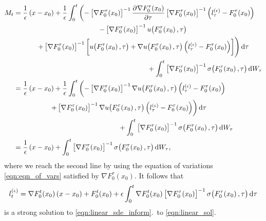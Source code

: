 \begin{align*}
	M_t & = \begin{multlined}[t]
		        \frac{1}{\epsilon}\left(x - x_0\right) + \frac{1}{\epsilon}\int_0^t\left(-\left[\nabla F_0^\tau\!\left(x_0\right)\right]^{-1} \dpd{\nabla F_0^\tau\!\left(x_0\right)}{\tau}\left[\nabla F_0^\tau\!\left(x_0\right)\right]^{-1}\left(l_\tau^{(\epsilon)} - F_0^\tau\!\left(x_0\right) \right)\right. \\
		        \left. - \left[\nabla F_0^\tau\!\left(x_0\right)\right]^{-1}u\!\left(F_0^\tau\!\left(x_0\right), \tau\right)\right. \\
		        \left. + \left[\nabla F_0^\tau\!\left(x_0\right)\right]^{-1}\left[ u\!\left(F_0^\tau\!\left(x_0\right), \tau\right) + \nabla u\!\left(F_0^\tau\!\left(x_0\right), \tau\right) \left(l_\tau^{(\epsilon)} - F_0^\tau\!\left(x_0\right)\right)\right] \right)\dif\tau \\
		        + \int_0^t{\left[\nabla F_0^\tau\!\left(x_0\right)\right]^{-1}\sigma\!\left(F_0^\tau\!\left(x_0\right), \tau\right)\dif W_\tau}
	        \end{multlined} \\
	    & = \begin{multlined}[t]
		        \frac{1}{\epsilon}\left(x - x_0\right) + \frac{1}{\epsilon}\int_0^t\left(-\left[\nabla F_0^\tau\!\left(x_0\right)\right]^{-1} \nabla u\!\left(F_0^\tau\!\left(x_0\right), \tau\right)\left(l_\tau^{(\epsilon)} - F_0^\tau\!\left(x_0\right) \right)\right. \\
		        \left. + \left[\nabla F_0^\tau\!\left(x_0\right)\right]^{-1}\nabla u\!\left(F_0^\tau\!\left(x_0\right), \tau\right) \left(l_\tau^{(\epsilon)} - F_0^\tau\!\left(x_0\right)\right) \right)\dif\tau \\
		        + \int_0^t{\left[\nabla F_0^\tau\!\left(x_0\right)\right]^{-1}\sigma\!\left(F_0^\tau\!\left(x_0\right), \tau\right)\dif W_\tau}
	        \end{multlined}              \\
	    & = \frac{1}{\epsilon}\left(x - x_0\right) + \int_0^t{\left[\nabla F_0^\tau\!\left(x_0\right)\right]^{-1}\sigma\!\left(F_0^\tau\!\left(x_0\right), \tau\right)\dif W_\tau},
\end{align*}
where we reach the second line by using the equation of variations \cref{eqn:eqn_of_vars} satisfied by \(\nabla F_0^\tau\!\left(x_0\right)\).
It follows that
\[
	l_t^{(\epsilon)} = \nabla F_0^t\!\left(x_0\right)\left(x - x_0\right) +  F_0^t\!\left(x_0\right) + \epsilon\int_0^t{\nabla F_0^t\!\left(x_0\right)\left[\nabla F_0^\tau\!\left(x_0\right)\right]^{-1} \sigma\!\left(F_0^\tau\!\left(x_0\right), \tau\right)\dif \tau}
\]
is a strong solution to \cref{eqn:linear_sde_inform}.\ to \cref{eqn:linear_sol}.

